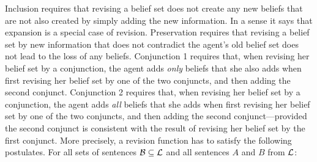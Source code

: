 Inclusion requires that revising a belief set does not create any new beliefs that are not also created by simply adding the new information. In a sense it says that expansion is a special case of revision.
Preservation requires that revising a belief set by new information that does not contradict the agent's old belief set does not lead to the loss of any beliefs.  %
Conjunction 1 requires that, when revising her belief set by a conjunction, the agent adds \emph{only} beliefs that she also adds when first revising her belief set by one of the two conjuncts, and then adding the second conjunct. Conjunction 2 requires that, when revising her belief set by a conjunction, the agent adds \emph{all} beliefs that she adds when first revising her belief set by one of the two conjuncts, and then adding the second conjunct---provided the second conjunct is consistent with the result of revising her belief set by the first conjunct. More precisely, a revision function has to satisfy the following postulates. For all sets of sentences $\cal B\subseteq L$ and all sentences $A$ and $B$ from $\cal L$:
